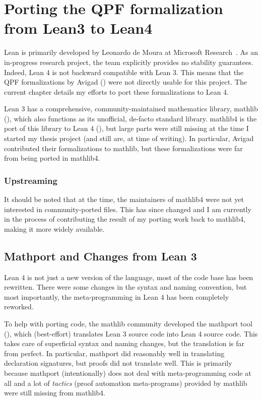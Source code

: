 
\chapter{Porting the QPF formalization from Lean3 to Lean4}%
\label{ch:porting}

Lean is primarily developed by Leonardo de Moura \etal{} at Microsoft Research~\cite{demouraLeanTheoremProver2015, avigadTheoremProvingLean}. As an in-progress research project, the team explicitly provides no stability guarantees. Indeed, Lean 4 is not backward compatible with Lean 3.
This means that the QPF formalizations by Avigad \etal{}
(\cite{avigadDataTypesQuotients2019a}) were not directly usable for this project. The current chapter details my efforts to port these formalizations to Lean 4.



Lean 3 has a comprehensive, community-maintained mathematics library, mathlib (\cite{themathlibcommunityLeanMathematicalLibrary2020}), 
which also functions as its unofficial, de-facto standard library.
mathlib4 is the port of this library to Lean 4 (\cite{mathlib4}),
but large parts were still missing at the time I started my thesis project (and still are, at time of writing).
In particular, Avigad \etal{} contributed their formalizations to mathlib, but these formalizations 
were far from being ported in mathlib4.



\subsection*{Upstreaming}
It should be noted that at the time, the maintainers of mathlib4 were not yet interested in 
community-ported files. This has since changed and I am currently in the process of
contributing the result of my porting work back to mathlib4, making it more widely available.




\section{Mathport and Changes from Lean 3}
Lean 4 is not just a new version of the language, most of the code base has been rewritten.
There were some changes in the syntax and naming convention, but most importantly, 
the meta-programming in Lean 4 has been completely reworked.

To help with porting code, the mathlib community developed the mathport tool (\cite{mathport}), which 
(best-effort) translates Lean 3 source code into Lean 4 source code. This takes care of superficial 
syntax and naming changes, but the translation is far from perfect.
In particular, mathport did reasonably well in translating declaration signatures, 
but proofs did not translate well.
This is primarily because mathport (intentionally) does not deal with meta-programming code at all and a lot
of \emph{tactics} (proof automation meta-programs) provided by mathlib were still missing from mathlib4.


